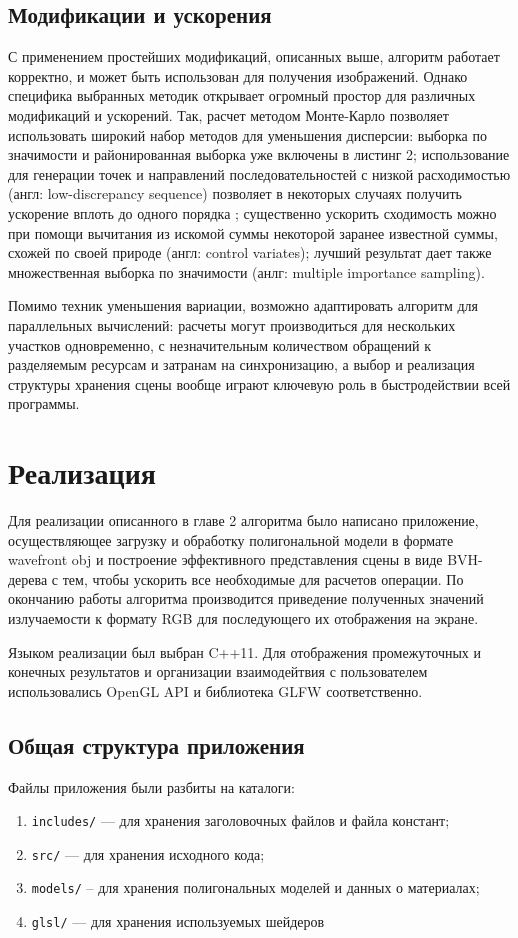 \documentclass[12pt]{article}
\begin{document}
\subsection{Модификации и ускорения}
С применением простейших модификаций, описанных выше, алгоритм работает корректно, и может быть использован для получения изображений. Однако специфика выбранных методик открывает огромный простор для различных модификаций и ускорений. Так, расчет методом Монте-Карло позволяет использовать широкий набор методов для уменьшения дисперсии: выборка по значимости и районированная выборка уже включены в листинг 2; использование для генерации точек и направлений последовательностей с низкой расходимостью (англ: low-discrepancy sequence) позволяет в некоторых случаях получить ускорение вплоть до одного порядка \cite{Kel96}; существенно ускорить сходимость можно при помощи вычитания из искомой суммы некоторой заранее известной суммы, схожей по своей природе (англ: control variates); лучший результат дает также множественная выборка по значимости (анлг: multiple importance sampling).

Помимо техник уменьшения вариации, возможно адаптировать алгоритм для параллельных вычислений: расчеты могут производиться  для нескольких участков одновременно, с незначительным количеством обращений к разделяемым ресурсам и затранам на синхронизацию, а выбор и реализация структуры хранения сцены вообще играют ключевую роль в быстродействии всей программы. 
\newpage\section{Реализация}
Для реализации описанного в главе 2 алгоритма было написано приложение, осуществляющее загрузку и обработку полигональной модели в формате wavefront obj и построение эффективного представления сцены в виде BVH-дерева с тем, чтобы ускорить все необходимые для расчетов операции. По окончанию работы алгоритма производится приведение полученных значений излучаемости к формату RGB для последующего их отображения на экране.

Языком реализации был выбран C++11. Для отображения промежуточных и конечных результатов и организации взаимодейтвия с пользователем использовались OpenGL API и библиотека GLFW соответственно.
\subsection{Общая структура приложения}
Файлы приложения были разбиты на каталоги: 
\begin{enumerate}
\item[] \texttt{includes/} --- для хранения заголовочных файлов и файла констант;
\item[] \texttt{src/} --- для хранения исходного кода;
\item[] \texttt{models/} -- для хранения полигональных моделей и данных о материалах;
\item[] \texttt{glsl/} --- для хранения используемых шейдеров
\end{enumerate}
\end{document}
